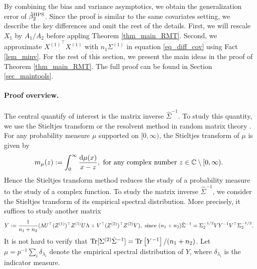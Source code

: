 By combining the bias and variance asymptotics, we obtain the generalization error of $\hat{\beta}_2^{\textup{HPS}}$.
Since the proof is similar to the same covariates setting, we describe the key differences and omit the rest of the details.
First, we will rescale $X_1$ by $A_1 / A_2$ before appling Theorem \ref{thm_main_RMT}.
Second, we approximate ${X^{(1)}}^{\top}X^{(1)}$ with $n_1 \Sigma^{(1)}$ in equation \eqref{eq_diff_cov} using Fact \ref{lem_minv}.
For the rest of this section, we present the main ideas in the proof of Theorem \ref{thm_main_RMT}.
The full proof can be found in Section \ref{sec_maintools}.

\paragraph{Proof overview.} The central quantify of interest is the matrix inverse $\hat{\Sigma}^{-1}$.
To study this quantity, we use the Stieltjes transform or the resolvent method in random matrix theory \cite{bai2009spectral,tao2012topics,erdos2017dynamical}.
For any probability measure $\mu$ supported on $[0,\infty)$, the Stieltjes transform of $\mu$ is given by
$$m_\mu(z):= \int_0^\infty \frac{\mathrm{d}\mu(x)}{x-z}, \text{ for any complex number } z\in \mathbb{C}\setminus [0,\infty).$$
Hence the Stieltjes transform method reduces the study of a probability measure to the study of a complex function.
To study the matrix inverse $\hat{\Sigma}^{-1}$, we consider the Stieltjes transform of its empirical spectral distribution.
More precisely, it suffices to study another matrix
\begin{align}\label{eigen2extra}
	Y := \frac{1}{n_1 + n_2}(\Lambda U^\top (Z^{(1)})^\top Z^{(1)} U\Lambda  + V^\top (Z^{(2)})^\top Z^{(2)}V), \text{ since } (n_1 + n_2)\hat{\Sigma}^{-1}= \Sigma_2^{-1/2} VY^{-1}V^\top \Sigma_2^{-1/2}.
\end{align}
It is not hard to verify that $\operatorname{Tr}[\Sigma^{(2)} \hat{\Sigma}^{-1}] = \operatorname{Tr}\left[Y^{-1}\right] / (n_1 + n_2)$.
Let $\mu=p^{-1}\sum_{i} \delta_{\lambda_i}$ denote the empirical spectral distribution of $Y$, where $\delta_{\lambda_i}$ is the indicator measure.
